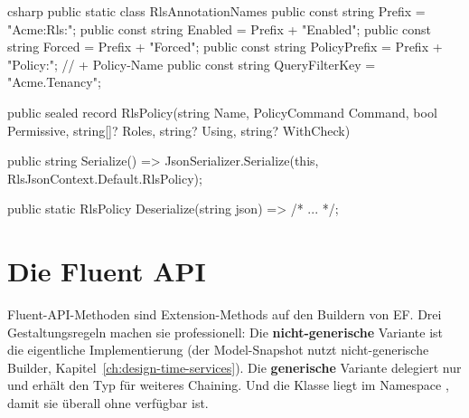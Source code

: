 \begin{sourcecode}{csharp}
public static class RlsAnnotationNames
{
    public const string Prefix = "Acme:Rls:";
    public const string Enabled = Prefix + "Enabled";
    public const string Forced = Prefix + "Forced";
    public const string PolicyPrefix = Prefix + "Policy:";     // + Policy-Name
    public const string QueryFilterKey = "Acme.Tenancy";
}

public sealed record RlsPolicy(string Name, PolicyCommand Command, bool Permissive,
    string[]? Roles, string? Using, string? WithCheck)
{
    public string Serialize()
        => JsonSerializer.Serialize(this, RlsJsonContext.Default.RlsPolicy);

    public static RlsPolicy Deserialize(string json) => /* ... */;
}
\end{sourcecode}

\section{Die Fluent API}

Fluent-API-Methoden sind Extension-Methods auf den Buildern von EF. Drei Gestaltungsregeln
machen sie professionell: Die \textbf{nicht-generische} Variante ist die eigentliche
Implementierung (der Model-Snapshot nutzt nicht-generische Builder,
Kapitel~\ref{ch:design-time-services}). Die \textbf{generische} Variante delegiert nur und
erhält den Typ für weiteres Chaining. Und die Klasse liegt im Namespace
, damit sie
überall ohne  verfügbar ist.

